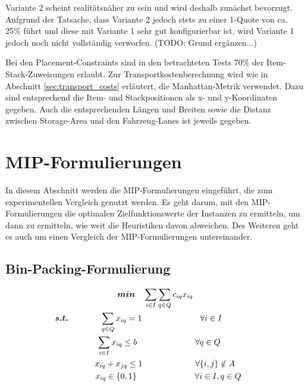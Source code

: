 Variante 2 scheint realitätsnäher zu sein und wird deshalb zunächst bevorzugt. Aufgrund der Tatsache, dass Variante 2 jedoch stets
zu einer 1-Quote von ca. 25\% führt und diese mit Variante 1 sehr gut konfigurierbar ist, wird Variante 1 jedoch noch nicht vollständig verworfen.
(TODO: Grund ergänzen...)

Bei den Placement-Constraints sind in den betrachteten Tests 70\% der Item-Stack-Zuweisungen erlaubt.
Zur Transportkostenberechnung wird wie in Abschnitt \ref{sec:transport_costs} erläutert, die Manhattan-Metrik verwendet. Dazu sind
entsprechend die Item- und Stackpositionen als x- und y-Koordinaten gegeben. Auch die entsprechenden Längen und Breiten sowie die Distanz zwischen Storage-Area und den Fahrzeug-Lanes ist jeweils gegeben.

\pagebreak

\section{MIP-Formulierungen}
\label{sec:mip_formulations}

In diesem Abschnitt werden die MIP-Formulierungen eingeführt, die zum experimentellen Vergleich genutzt werden.
Es geht darum, mit den MIP-Formulierungen die optimalen Zielfunktionswerte der Instanzen zu ermitteln, um dann
zu ermitteln, wie weit die Heuristiken davon abweichen. Des Weiteren geht es auch um einen Vergleich der MIP-Formulierungen
untereinander.

\subsection{Bin-Packing-Formulierung}
\label{sec:bin_packing_formulation}

\begin{gather}
\boldsymbol{min} \quad \sum_{i \in I} \sum_{q \in Q} c_{iq} x_{iq} \\
\thinspace\thinspace \boldsymbol{s.t.} \thinspace\quad\thinspace\thinspace\thinspace\quad\thinspace \quad \sum_{q \in Q} x_{iq} = 1 \quad\quad\quad\quad\quad\quad\quad \forall i \in I \quad\quad\quad\quad\thinspace\thinspace \\
\quad \sum_{i \in I} x_{iq} \leq b \quad\quad\quad\quad\quad\quad\quad \forall q \in Q \\
\thinspace\thinspace\quad\quad x_{iq} + x_{jq} \leq 1 \quad\quad\thinspace\thinspace\quad\quad\quad\quad \forall \{i, j\} \notin A \\
\thinspace\thinspace\quad\quad\quad x_{iq} \in \{0, 1\} \thinspace\thinspace\thinspace\thinspace\thinspace\thinspace\quad\quad\quad\quad\quad\quad \forall i \in I, q \in Q \thinspace
\end{gather}

